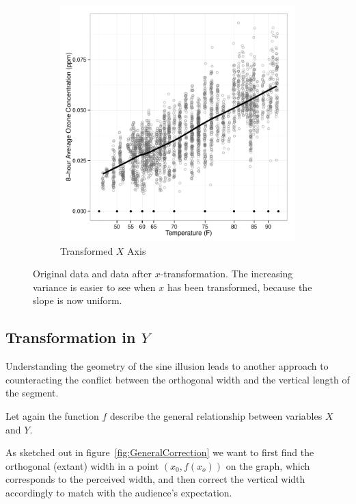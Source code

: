 \documentclass[11pt]{isuthesis}\usepackage[]{graphicx}\usepackage[]{color}
\begin{document}
\begin{figure}[h!]
\begin{subfigure}[b]{.48\textwidth}
\includegraphics[keepaspectratio=TRUE,width=\textwidth]{fig-xtrans-example2}
\caption{Transformed $X$ Axis}\label{fig:xtrans-example-trans}
\end{subfigure}
\caption[Original data and data after X transformation]{Original data and data after $x$-transformation. The increasing variance is easier to see when $x$ has been transformed, because the slope is now uniform.\label{fig:xtrans-example}}
\end{figure}


\subsection{Transformation in $Y$}
Understanding the geometry of the sine illusion leads to another approach to counteracting  the conflict between the orthogonal width and the vertical length of the segment. 


Let again the function $f$ describe the general relationship between variables $X$ and $Y$. 


As sketched out in figure~\ref{fig:GeneralCorrection} we want to first find the orthogonal (extant) width in a point $(x_0, f(x_o))$ on the graph, which corresponds to the  perceived width, and then correct the vertical width accordingly to match with the audience's expectation.
\end{document}
